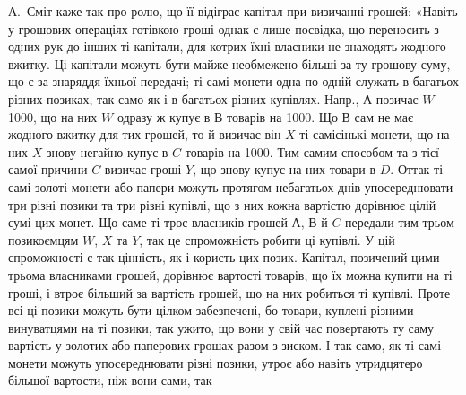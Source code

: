 А.~Сміт каже так про ролю, що її відіграє капітал при визичанні грошей:
«Навіть у грошових операціях готівкою гроші однак є лише посвідка, що переносить
з одних рук до інших ті капітали, для котрих їхні власники не знаходять
жодного вжитку. Ці капітали можуть бути майже необмежено більші за ту
грошову суму, що є за знаряддя їхньої передачі; ті самі монети одна по одній
служать в багатьох різних позиках, так само як і в багатьох різних купівлях.
Напр., $А$ позичає $W$ 1000, що на них $W$ одразу ж купує в $В$ товарів
на 1000. Що $В$ сам не має жодного вжитку для тих грошей, то й визичає
він $X$ ті самісінькі монети, що на них $X$ знову негайно купує в $C$ товарів
на 1000. Тим самим способом та з тієї самої причини $C$ визичає гроші
$Y$, що знову купує на них товари в $D$. Оттак ті самі золоті монети або папери
можуть протягом небагатьох днів упосереднювати три різні позики та три різні
купівлі, що з них кожна вартістю дорівнює цілій сумі цих монет. Що саме ті троє
власників грошей $А$, $В$ й $C$ передали тим трьом позикоємцям $W$, $X$ та $Y$, так це
спроможність робити ці купівлі. У цій спроможності є так цінність, як і користь цих
позик. Капітал, позичений цими трьома власниками грошей, дорівнює вартості
товарів, що їх можна купити на ті гроші, і втроє більший за вартість грошей,
що на них робиться ті купівлі. Проте всі ці позики можуть бути цілком забезпечені,
бо товари, куплені різними винуватцями на ті позики, так ужито, що
вони у свій час повертають ту саму вартість у золотих або паперових грошах
разом з зиском. І так само, як ті самі монети можуть упосереднювати різні позики,
утроє або навіть утридцятеро більшої вартости, ніж вони сами, так
\parbreak{}  %

